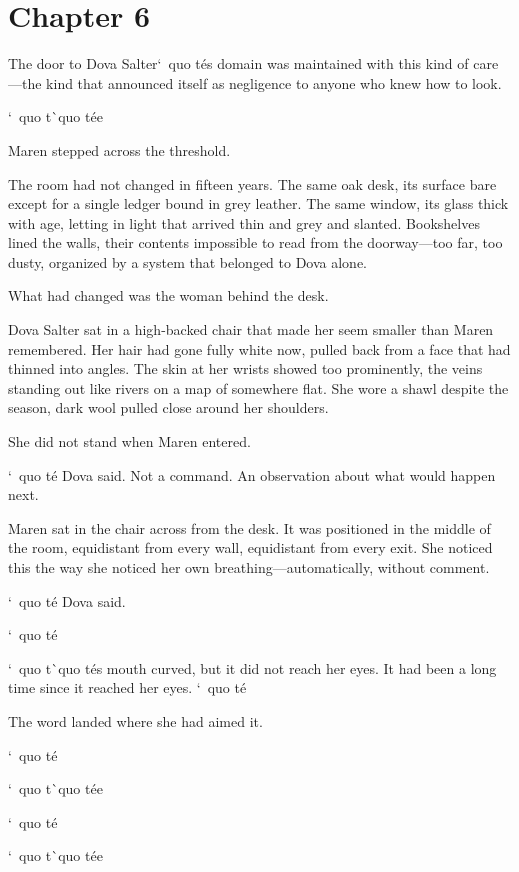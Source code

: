 \documentclass[12pt,letterpaper,openany]{book}
\begin{document}
\chapter{Chapter 6}
The door to Dova Salter`\ quo t\'e{}s domain was maintained with this kind of care—the kind that announced itself as negligence to anyone who knew how to look.
\par
`\ quo t\`\ quo t\'e{}e{}
\par
Maren stepped across the threshold.
\par
The room had not changed in fifteen years. The same oak desk, its surface bare except for a single ledger bound in grey leather. The same window, its glass thick with age, letting in light that arrived thin and grey and slanted. Bookshelves lined the walls, their contents impossible to read from the doorway—too far, too dusty, organized by a system that belonged to Dova alone.
\par
What had changed was the woman behind the desk.
\par
Dova Salter sat in a high-backed chair that made her seem smaller than Maren remembered. Her hair had gone fully white now, pulled back from a face that had thinned into angles. The skin at her wrists showed too prominently, the veins standing out like rivers on a map of somewhere flat. She wore a shawl despite the season, dark wool pulled close around her shoulders.
\par
She did not stand when Maren entered.
\par
`\ quo t\'e{} Dova said. Not a command. An observation about what would happen next.
\par
Maren sat in the chair across from the desk. It was positioned in the middle of the room, equidistant from every wall, equidistant from every exit. She noticed this the way she noticed her own breathing—automatically, without comment.
\par
`\ quo t\'e{} Dova said.
\par
`\ quo t\'e{}
\par
`\ quo t\`\ quo t\'e{}s mouth curved, but it did not reach her eyes. It had been a long time since it reached her eyes. `\ quo t\'e{}
\par
The word landed where she had aimed it.
\par
`\ quo t\'e{}
\par
`\ quo t\`\ quo t\'e{}e{}
\par
`\ quo t\'e{}
\par
`\ quo t\`\ quo t\'e{}e{}
\par
\end{document}
